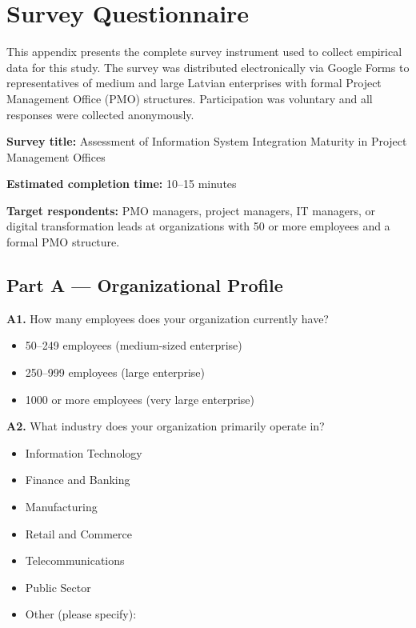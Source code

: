 \chapter{Survey Questionnaire}
\label{chap:appendixA}

This appendix presents the complete survey instrument used to collect empirical
data for this study. The survey was distributed electronically via Google Forms
to representatives of medium and large Latvian enterprises with formal Project
Management Office (PMO) structures. Participation was voluntary and all
responses were collected anonymously.

\bigskip
\noindent\textbf{Survey title:} Assessment of Information System Integration
Maturity in Project Management Offices

\noindent\textbf{Estimated completion time:} 10--15 minutes

\noindent\textbf{Target respondents:} PMO managers, project managers, IT
managers, or digital transformation leads at organizations with 50 or more
employees and a formal PMO structure.

\bigskip

\section*{Part A --- Organizational Profile}

\noindent\textbf{A1.} How many employees does your organization currently have?

\begin{itemize}
  \item[$\square$] 50--249 employees (medium-sized enterprise)
  \item[$\square$] 250--999 employees (large enterprise)
  \item[$\square$] 1000 or more employees (very large enterprise)
\end{itemize}

\bigskip
\noindent\textbf{A2.} What industry does your organization primarily operate in?

\begin{itemize}
  \item[$\square$] Information Technology
  \item[$\square$] Finance and Banking
  \item[$\square$] Manufacturing
  \item[$\square$] Retail and Commerce
  \item[$\square$] Telecommunications
  \item[$\square$] Public Sector
  \item[$\square$] Other (please specify): \underline{\hspace{5cm}}
\end{itemize}

